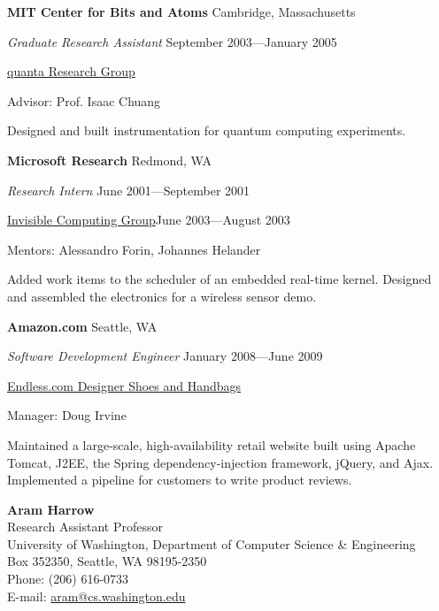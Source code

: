 \documentclass[letter]{article}
\begin{document}
\vspace{\baselineskip}
\par
{\bf MIT Center for Bits and Atoms} \hfill Cambridge, Massachusetts
\par
{\em Graduate Research Assistant} \hfill September 2003---January 2005
\par
\href{http://web.mit.edu/~cua/www/quanta/}{quanta Research Group}
\par
Advisor: Prof. Isaac Chuang
\par
Designed and built instrumentation for quantum computing experiments.
\par

\vspace{\baselineskip}
\par
{\bf Microsoft Research} \hfill Redmond, WA
\par
{\em Research Intern} \hfill June 2001---September 2001
\par
\href{http://research.microsoft.com/en-us/projects/mic/default.aspx}{Invisible Computing Group}\hfill June 2003---August 2003
\par
Mentors: Alessandro Forin, Johannes Helander
\par
Added work items to the scheduler of an embedded real-time kernel.
Designed and assembled the electronics for a wireless sensor demo.

\par

\vspace{\baselineskip}
\par
{\bf {Amazon.com}} \hfill Seattle, WA
\par
{\em Software Development Engineer} \hfill January 2008---June 2009
\par
\href{http://www.endless.com}{Endless.com Designer Shoes and Handbags}
\par
Manager: Doug Irvine
\par
Maintained a large-scale, high-availability
retail website built using Apache Tomcat, J2EE,
the Spring dependency-injection framework, jQuery, and Ajax. Implemented a
pipeline for customers to write product reviews.

\pagebreak

{\bf Aram Harrow}
\\
Research Assistant Professor\\
University of Washington, Department of Computer Science \& Engineering\\
Box 352350, Seattle, WA 98195-2350\\
Phone: (206) 616-0733\\
E-mail: \url{aram@cs.washington.edu}\\
\end{document}
